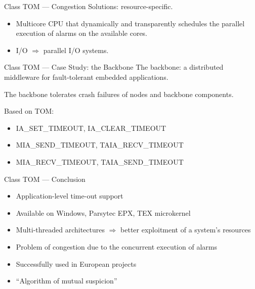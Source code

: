 \begin{frame}[fragile]{Class TOM --- Congestion}
\noindent
Solutions: resource-specific. 
\begin{itemize}
\item Multicore CPU 
      that dynamically
      and transparently schedules the parallel execution of alarms
      on the available cores.
\item I/O $\Rightarrow$
      parallel I/O systems.
\end{itemize}


\end{frame}
\begin{frame}[fragile]{Class TOM --- Case Study: the Backbone}
\noindent
The backbone: a distributed middleware for fault-tolerant embedded
applications.


\vspace{20pt}

\noindent 
The backbone tolerates crash failures of nodes and backbone components.


\vspace{20pt}

\noindent
Based on TOM:
\begin{itemize}
\item IA\_SET\_TIMEOUT, IA\_CLEAR\_TIMEOUT
\item MIA\_SEND\_TIMEOUT, TAIA\_RECV\_TIMEOUT
\item MIA\_RECV\_TIMEOUT, TAIA\_SEND\_TIMEOUT
\end{itemize}


\end{frame}
\begin{frame}[fragile]{Class TOM --- Conclusion}
\noindent
\begin{itemize}
\item Application-level time-out support
\item Available on Windows, Parsytec EPX, TEX microkernel
\item Multi-threaded architectures $\Rightarrow$ better exploitment
      of a system's resources
\item Problem of congestion due to the concurrent execution of alarms
\item Successfully used in European projects
\item ``Algorithm of mutual suspicion''
\end{itemize}


\end{frame}
